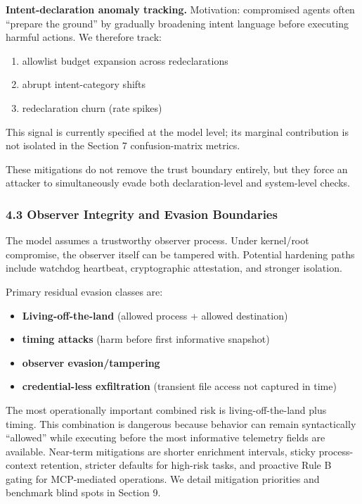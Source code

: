 \documentclass[
]{article}
\providecommand{\tightlist}{%
  \setlength{\itemsep}{0pt}\setlength{\parskip}{0pt}}
\begin{document}
\textbf{Intent-declaration anomaly tracking.} Motivation: compromised
agents often ``prepare the ground'' by gradually broadening intent
language before executing harmful actions. We therefore track:

\begin{enumerate}
\def\labelenumi{\arabic{enumi}.}
\tightlist
\item
  allowlist budget expansion across redeclarations
\item
  abrupt intent-category shifts
\item
  redeclaration churn (rate spikes)
\end{enumerate}

This signal is currently specified at the model level; its marginal
contribution is not isolated in the Section 7 confusion-matrix metrics.

These mitigations do not remove the trust boundary entirely, but they
force an attacker to simultaneously evade both declaration-level and
system-level checks.

\subsubsection{4.3 Observer Integrity and Evasion
Boundaries}\label{observer-integrity-and-evasion-boundaries}

The model assumes a trustworthy observer process. Under kernel/root
compromise, the observer itself can be tampered with. Potential
hardening paths include watchdog heartbeat, cryptographic attestation,
and stronger isolation.

Primary residual evasion classes are:

\begin{itemize}
\tightlist
\item
  \textbf{Living-off-the-land} (allowed process + allowed destination)
\item
  \textbf{timing attacks} (harm before first informative snapshot)
\item
  \textbf{observer evasion/tampering}
\item
  \textbf{credential-less exfiltration} (transient file access not
  captured in time)
\end{itemize}

The most operationally important combined risk is living-off-the-land
plus timing. This combination is dangerous because behavior can remain
syntactically ``allowed'' while executing before the most informative
telemetry fields are available. Near-term mitigations are shorter
enrichment intervals, sticky process-context retention, stricter
defaults for high-risk tasks, and proactive Rule B gating for
MCP-mediated operations. We detail mitigation priorities and benchmark
blind spots in Section 9.
\end{document}
